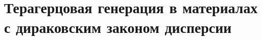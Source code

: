 \chapter{Терагерцовая генерация в материалах с дираковским законом дисперсии} \label{chapter:graphene}



